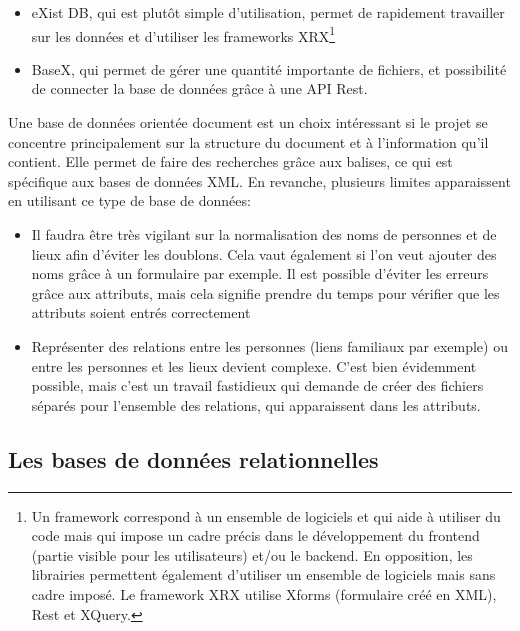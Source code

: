 \begin{itemize}
    \item eXist DB, qui est plutôt simple d’utilisation, permet de rapidement travailler sur les données et d’utiliser les frameworks XRX\footnote{Un framework correspond à un ensemble de logiciels et qui aide à utiliser du code mais qui impose un cadre précis dans le développement du frontend (partie visible pour les utilisateurs) et/ou le backend. En opposition, les librairies permettent également d’utiliser un ensemble de logiciels mais sans cadre imposé. Le framework XRX utilise Xforms (formulaire créé en XML), Rest et XQuery.}
    \item BaseX, qui permet de gérer une quantité importante de fichiers, et possibilité de connecter la base de données grâce à une API Rest.\\
    
\end{itemize}

\noindent Une base de données orientée document est un choix intéressant si le projet se concentre principalement sur la structure du document et à l’information qu’il contient. Elle permet de faire des recherches grâce aux balises, ce qui est spécifique aux bases de données XML. En revanche, plusieurs limites apparaissent en utilisant ce type de base de données:\\ 

\begin{itemize}
    \item Il faudra être très vigilant sur la normalisation des noms de personnes et de lieux afin d’éviter les doublons. Cela vaut également si l’on veut ajouter des noms grâce à un formulaire par exemple. Il est possible d’éviter les erreurs grâce aux attributs, mais cela signifie prendre du temps pour vérifier que les attributs soient entrés correctement
    \item Représenter des relations entre les personnes (liens familiaux par exemple) ou entre les personnes et les lieux devient complexe. C’est bien évidemment possible, mais c’est un travail fastidieux qui demande de créer des fichiers séparés pour l’ensemble des relations, qui apparaissent dans les attributs.
\end{itemize}
    
    \subsection{Les bases de données relationnelles}

